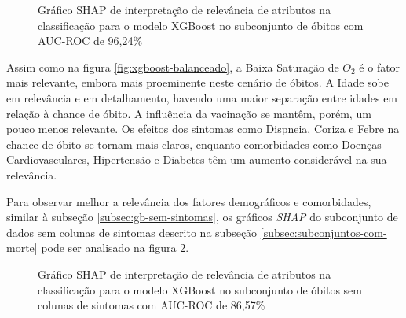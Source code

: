 \begin{figure}[ht!]
  \centering
  \caption{\textmd{Gráfico SHAP de interpretação de relevância de atributos na classificação para o modelo XGBoost no subconjunto de óbitos com AUC-ROC de 96,24\%}}
  \label{fig:xgb-obito}
\end{figure}

Assim como na figura \ref{fig:xgboost-balanceado}, a Baixa Saturação de $O_2$ é o fator mais relevante, embora mais proeminente neste cenário de óbitos. A Idade sobe em relevância e em detalhamento, havendo uma maior separação entre idades em relação à chance de óbito. A influência da vacinação se mantêm, porém, um pouco menos relevante. Os efeitos dos sintomas como Dispneia, Coriza e Febre na chance de óbito se tornam mais claros, enquanto comorbidades como Doenças Cardiovasculares, Hipertensão e Diabetes têm um aumento considerável na sua relevância.

Para observar melhor a relevância dos fatores demográficos e comorbidades, similar à subseção \ref{subsec:gb-sem-sintomas}, os gráficos \textit{SHAP} do subconjunto de dados sem colunas de sintomas descrito na subseção \ref{subsec:subconjuntos-com-morte} pode ser analisado na figura \ref{fig:xgb-obito-sem-sintomas}.

\begin{figure}[ht!]
  \centering
  \caption{\textmd{Gráfico SHAP de interpretação de relevância de atributos na classificação para o modelo XGBoost no subconjunto de óbitos sem colunas de sintomas com AUC-ROC de 86,57\%}}
  \label{fig:xgb-obito-sem-sintomas}
\end{figure}

